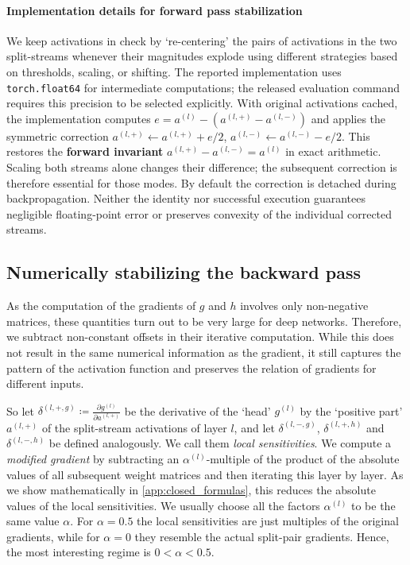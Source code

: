 \paragraph{Implementation details for forward pass stabilization}
We keep activations in check by `re-centering' the pairs of
activations in the two split-streams whenever their magnitudes explode using different strategies based on thresholds, scaling, or shifting.
The reported implementation uses \texttt{torch.float64} for intermediate computations; the released evaluation command requires this precision to be selected explicitly.
With original activations cached, the implementation computes $e=a^{(l)}-(a^{(l,+)}-a^{(l,-)})$ and applies the symmetric correction $a^{(l,+)}\leftarrow a^{(l,+)}+e/2$, $a^{(l,-)}\leftarrow a^{(l,-)}-e/2$. This restores the \textbf{forward invariant} $a^{(l,+)}-a^{(l,-)}=a^{(l)}$ in exact arithmetic. Scaling both streams alone changes their difference; the subsequent correction is therefore essential for those modes. By default the correction is detached during backpropagation. Neither the identity nor successful execution guarantees negligible floating-point error or preserves convexity of the individual corrected streams.

\subsection{Numerically stabilizing the backward pass} \label{sec:backward}

As the computation of the gradients of $g$ and $h$ involves only non-negative matrices, these quantities turn out to be very large for deep networks. 
Therefore, we subtract non-constant offsets in their iterative computation. 
While this does not result in the same numerical information as the gradient, it still captures the pattern of the activation function and preserves the relation of gradients for different inputs. 

So let $\delta^{(l,+,g)} \coloneqq \frac{\partial g^{(l)}}{\partial a^{(l,+)}}$ be the derivative of the `head' $g^{(l)}$ by the `positive part' $a^{(l,+)}$ of the split-stream activations of layer $l$, and let $\delta^{(l,-,g)}$, $\delta^{(l,+,h)}$ and $\delta^{(l,-,h)}$ be defined analogously. 
We call them \emph{local sensitivities}. 
We compute a \emph{modified gradient} by subtracting
an $\alpha^{(l)}$-multiple of the product of the absolute values of all subsequent weight matrices and then iterating this layer by layer. As we show mathematically in \cref{app:closed_formulas}, this reduces the absolute values of the local sensitivities.
We usually choose all the factors $\alpha^{(l)}$ to be the same value $\alpha$.
For $\alpha = 0.5$ the local sensitivities are just multiples of the original gradients, while for $\alpha = 0$ they resemble the actual split-pair gradients.
Hence, the most interesting regime is $0 < \alpha < 0.5$.

